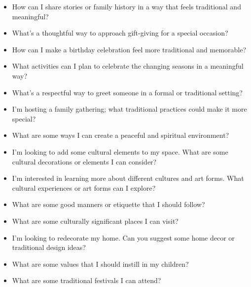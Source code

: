 \begin{itemize}
\begin{itemize}
    \item How can I share stories or family history in a way that feels traditional and meaningful?
    \item What's a thoughtful way to approach gift-giving for a special occasion?
    \item How can I make a birthday celebration feel more traditional and memorable?
    \item What activities can I plan to celebrate the changing seasons in a meaningful way?
    \item What's a respectful way to greet someone in a formal or traditional setting?
    \item I'm hosting a family gathering; what traditional practices could make it more special?
    \item What are some ways I can create a peaceful and spiritual environment?
    \item I'm looking to add some cultural elements to my space. What are some cultural decorations or elements I can consider?
    \item I'm interested in learning more about different cultures and art forms. What cultural experiences or art forms can I explore?
    \item What are some good manners or etiquette that I should follow?
    \item What are some culturally significant places I can visit?
    \item I'm looking to redecorate my home. Can you suggest some home decor or traditional design ideas?
    \item What are some values that I should instill in my children?
    \item What are some traditional festivals I can attend?
  \end{itemize}


\end{itemize}
